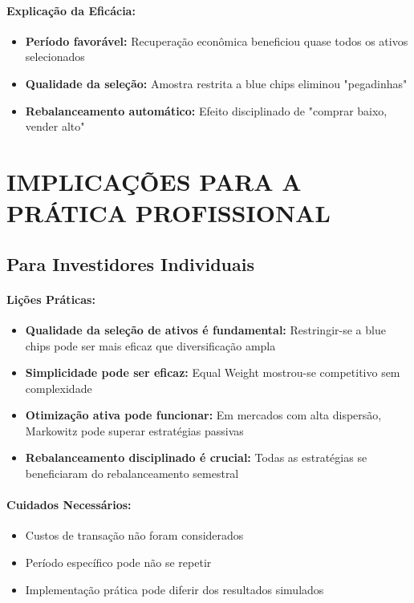 \paragraph{Explicação da Eficácia:}
\begin{itemize}
    \item \textbf{Período favorável:} Recuperação econômica beneficiou quase todos os ativos selecionados
    \item \textbf{Qualidade da seleção:} Amostra restrita a blue chips eliminou "pegadinhas"
    \item \textbf{Rebalanceamento automático:} Efeito disciplinado de "comprar baixo, vender alto"
\end{itemize}

\section{IMPLICAÇÕES PARA A PRÁTICA PROFISSIONAL}

\subsection{Para Investidores Individuais}

\paragraph{Lições Práticas:}
\begin{itemize}
    \item \textbf{Qualidade da seleção de ativos é fundamental:} Restringir-se a blue chips pode ser mais eficaz que diversificação ampla
    \item \textbf{Simplicidade pode ser eficaz:} Equal Weight mostrou-se competitivo sem complexidade
    \item \textbf{Otimização ativa pode funcionar:} Em mercados com alta dispersão, Markowitz pode superar estratégias passivas
    \item \textbf{Rebalanceamento disciplinado é crucial:} Todas as estratégias se beneficiaram do rebalanceamento semestral
\end{itemize}

\paragraph{Cuidados Necessários:}
\begin{itemize}
    \item Custos de transação não foram considerados
    \item Período específico pode não se repetir
    \item Implementação prática pode diferir dos resultados simulados
\end{itemize}

